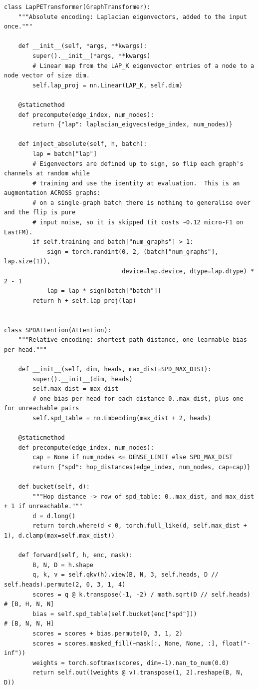 \begin{lstlisting}[style=p1py]
class LapPETransformer(GraphTransformer):
    """Absolute encoding: Laplacian eigenvectors, added to the input once."""

    def __init__(self, *args, **kwargs):
        super().__init__(*args, **kwargs)
        # Linear map from the LAP_K eigenvector entries of a node to a node vector of size dim.
        self.lap_proj = nn.Linear(LAP_K, self.dim)

    @staticmethod
    def precompute(edge_index, num_nodes):
        return {"lap": laplacian_eigvecs(edge_index, num_nodes)}

    def inject_absolute(self, h, batch):
        lap = batch["lap"]
        # Eigenvectors are defined up to sign, so flip each graph's channels at random while
        # training and use the identity at evaluation.  This is an augmentation ACROSS graphs:
        # on a single-graph batch there is nothing to generalise over and the flip is pure
        # input noise, so it is skipped (it costs ~0.12 micro-F1 on LastFM).
        if self.training and batch["num_graphs"] > 1:
            sign = torch.randint(0, 2, (batch["num_graphs"], lap.size(1)),
                                 device=lap.device, dtype=lap.dtype) * 2 - 1
            lap = lap * sign[batch["batch"]]
        return h + self.lap_proj(lap)


class SPDAttention(Attention):
    """Relative encoding: shortest-path distance, one learnable bias per head."""

    def __init__(self, dim, heads, max_dist=SPD_MAX_DIST):
        super().__init__(dim, heads)
        self.max_dist = max_dist
        # one bias per head for each distance 0..max_dist, plus one for unreachable pairs
        self.spd_table = nn.Embedding(max_dist + 2, heads)

    @staticmethod
    def precompute(edge_index, num_nodes):
        cap = None if num_nodes <= DENSE_LIMIT else SPD_MAX_DIST
        return {"spd": hop_distances(edge_index, num_nodes, cap=cap)}

    def bucket(self, d):
        """Hop distance -> row of spd_table: 0..max_dist, and max_dist + 1 if unreachable."""
        d = d.long()
        return torch.where(d < 0, torch.full_like(d, self.max_dist + 1), d.clamp(max=self.max_dist))

    def forward(self, h, enc, mask):
        B, N, D = h.shape
        q, k, v = self.qkv(h).view(B, N, 3, self.heads, D // self.heads).permute(2, 0, 3, 1, 4)
        scores = q @ k.transpose(-1, -2) / math.sqrt(D // self.heads)      # [B, H, N, N]
        bias = self.spd_table(self.bucket(enc["spd"]))                     # [B, N, N, H]
        scores = scores + bias.permute(0, 3, 1, 2)
        scores = scores.masked_fill(~mask[:, None, None, :], float("-inf"))
        weights = torch.softmax(scores, dim=-1).nan_to_num(0.0)
        return self.out((weights @ v).transpose(1, 2).reshape(B, N, D))
\end{lstlisting}

